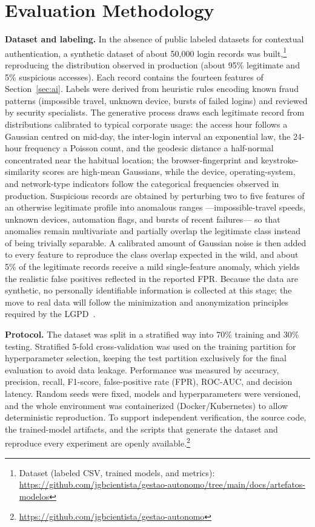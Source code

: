 \documentclass[conference]{IEEEtran}
\begin{document}
\section{Evaluation Methodology}
\label{sec:method}
\textbf{Dataset and labeling.} In the absence of public labeled
datasets for contextual authentication, a synthetic dataset of about
50{,}000 login records was built,\footnote{Dataset (labeled CSV, trained models, and metrics): \url{https://github.com/jgbcientista/gestao-autonomo/tree/main/docs/artefatos-modelos}} reproducing the distribution observed
in production (about 95\% legitimate and 5\% suspicious accesses). Each
record contains the fourteen features of Section~\ref{sec:ai}. Labels
were derived from heuristic rules encoding known fraud patterns
(impossible travel, unknown device, bursts of failed logins) and
reviewed by security specialists. The generative process draws each
legitimate record from distributions calibrated to typical corporate
usage: the access hour follows a Gaussian centred on mid-day, the
inter-login interval an exponential law, the 24-hour frequency a Poisson
count, and the geodesic distance a half-normal concentrated near the
habitual location; the browser-fingerprint and keystroke-similarity
scores are high-mean Gaussians, while the device, operating-system, and
network-type indicators follow the categorical frequencies observed in
production. Suspicious records are obtained by perturbing two to five
features of an otherwise legitimate profile into anomalous ranges
---impossible-travel speeds, unknown devices, automation flags, and
bursts of recent failures--- so that anomalies remain multivariate and
partially overlap the legitimate class instead of being trivially
separable. A calibrated amount of Gaussian noise is then added to every
feature to reproduce the class overlap expected in the wild, and about
5\% of the legitimate records receive a mild single-feature anomaly,
which yields the realistic false positives reflected in the reported
FPR. Because the data are synthetic, no
personally identifiable information is collected at this stage; the move
to real data will follow the minimization and anonymization principles
required by the LGPD~\cite{lgpd2018}.

\textbf{Protocol.} The dataset was split in a stratified way into 70\%
training and 30\% testing. Stratified 5-fold cross-validation was used
on the training partition for hyperparameter selection, keeping the
test partition exclusively for the final evaluation to avoid data
leakage. Performance was measured by accuracy, precision, recall,
F1-score, false-positive rate (FPR), ROC-AUC, and decision latency.
Random seeds were fixed, models and hyperparameters were versioned, and
the whole environment was containerized (Docker/Kubernetes) to allow
deterministic reproduction. To support independent verification, the
source code, the trained-model artifacts, and the scripts that generate
the dataset and reproduce every experiment are openly
available.\footnote{\url{https://github.com/jgbcientista/gestao-autonomo}}
\end{document}
